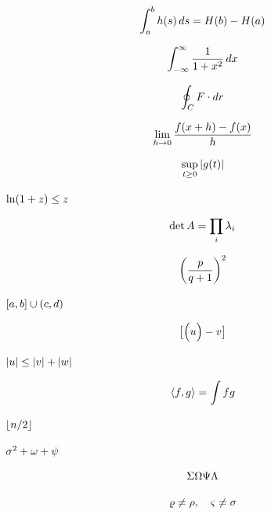 \documentclass{article}
\newcommand*\pdfcraftbegin[1]{\special{pdfcraft:eq:#1:begin}}
\newcommand*\pdfcraftend[1]{\special{pdfcraft:eq:#1:end}}
\begin{document}
\setcounter{equation}{0}
\[\pdfcraftbegin{ho_int_display}
\int_{a}^{b} h(s)\,ds = H(b) - H(a)
\pdfcraftend{ho_int_display}\]
\par
\newpage
\setcounter{equation}{0}
\[\pdfcraftbegin{ho_int_inf}
\int_{-\infty}^{\infty} \frac{1}{1+x^2}\,dx
\pdfcraftend{ho_int_inf}\]
\par
\newpage
\setcounter{equation}{0}
\[\pdfcraftbegin{ho_oint}
\oint_C F \cdot dr
\pdfcraftend{ho_oint}\]
\par
\newpage
\setcounter{equation}{0}
\[\pdfcraftbegin{ho_lim_basic}
\lim_{h \to 0} \frac{f(x+h) - f(x)}{h}
\pdfcraftend{ho_lim_basic}\]
\par
\newpage
\setcounter{equation}{0}
\[\pdfcraftbegin{ho_sup_abs}
\sup_{t \ge 0} |g(t)|
\pdfcraftend{ho_sup_abs}\]
\par
\newpage
\setcounter{equation}{0}
$\pdfcraftbegin{ho_ln_inline}
\ln(1+z) \le z
\pdfcraftend{ho_ln_inline}$
\par
\newpage
\setcounter{equation}{0}
\[\pdfcraftbegin{ho_det_prod}
\det A = \prod_i \lambda_i
\pdfcraftend{ho_det_prod}\]
\par
\newpage
\setcounter{equation}{0}
\[\pdfcraftbegin{ho_paren_script}
\left( \frac{p}{q+1} \right)^2
\pdfcraftend{ho_paren_script}\]
\par
\newpage
\setcounter{equation}{0}
$\pdfcraftbegin{ho_brackets}
[a, b] \cup (c, d)
\pdfcraftend{ho_brackets}$
\par
\newpage
\setcounter{equation}{0}
\[\pdfcraftbegin{ho_big_sizes}
\bigl[ \Bigl( u \Bigr) - v \bigr]
\pdfcraftend{ho_big_sizes}\]
\par
\newpage
\setcounter{equation}{0}
$\pdfcraftbegin{ho_abs_three}
|u| \le |v| + |w|
\pdfcraftend{ho_abs_three}$
\par
\newpage
\setcounter{equation}{0}
\[\pdfcraftbegin{ho_angle_int}
\langle f, g \rangle = \int f g
\pdfcraftend{ho_angle_int}\]
\par
\newpage
\setcounter{equation}{0}
$\pdfcraftbegin{ho_floor_half}
\lfloor n/2 \rfloor
\pdfcraftend{ho_floor_half}$
\par
\newpage
\setcounter{equation}{0}
$\pdfcraftbegin{ho_greek_mix}
\sigma^2 + \omega + \psi
\pdfcraftend{ho_greek_mix}$
\par
\newpage
\setcounter{equation}{0}
\[\pdfcraftbegin{ho_greek_caps}
\Sigma \Omega \Psi \Lambda
\pdfcraftend{ho_greek_caps}\]
\par
\newpage
\setcounter{equation}{0}
\[\pdfcraftbegin{ho_greek_var}
\varrho \ne \rho, \quad \varsigma \ne \sigma
\pdfcraftend{ho_greek_var}\]
\end{document}

